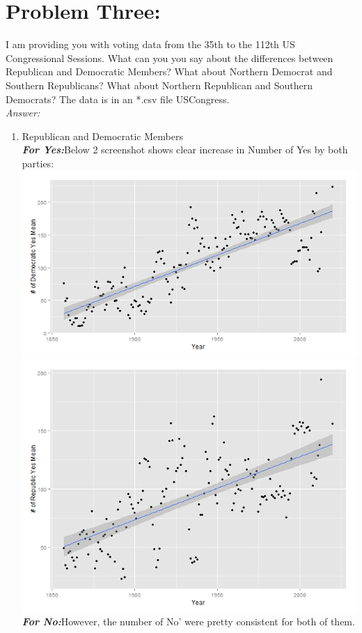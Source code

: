 \documentclass{article}
\begin{document}
\section*{Problem Three: } I am providing you with voting data from the 35th to the 112th US Congressional Sessions. What can you you say about the differences between Republican and Democratic Members? What about Northern Democrat and Southern Republicans? What about Northern Republican and Southern Democrats? The data is in an *.csv file USCongress. \\
\emph{Answer:} 
\begin{enumerate}
	\item Republican and Democratic Members \\
	\textbf{\emph{For Yes:}}Below 2 screenshot shows clear increase in Number of Yes by both parties:\\
\includegraphics{DemocratYes} \\
\includegraphics{RepublicYes} \\
	\textbf{\emph{For No:}}However, the number of No' were pretty consistent for both of them.


\end{enumerate}
\end{document}
